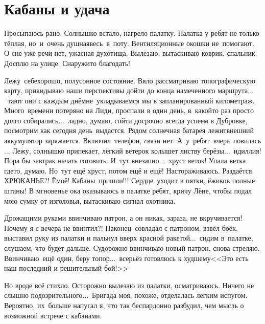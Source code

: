 \chapter{Кабаны и удача}
\vepsianrose

Просыпаюсь рано. Солнышко встало, нагрело палатку. Палатка у ребят не только тёплая, но~и~очень душная\mdash весь~в~поту. Вентиляционные окошки не~помогают. О сне уже речи нет, ужасная духотища. Вылезаю, вытаскиваю коврик, спальник. Досплю на улице. Снаружи\sdash то благодать! 

Лежу~себе\mdash хорошо, полусонное состояние. Вяло рассматриваю топографическую карту, прикидываю наши перспективы дойти до конца намеченного маршрута$\ldots$~тают они с каждым днём\mdash не~укладываемся мы в запланированный километраж. Много~времени потеряно на Лиди, проспали в один день, в~какой\sdash то раз просто долго собирались$\ldots$~ладно, думаю, сойти досрочно всегда успеем в Дубровке, посмотрим как сегодня день~выдастся. Рядом солнечная батарея лежит\mdash внешний аккумулятор заряжается. Включил~телефон, cвязи нет. А~у~ребят~вчера~ловилась$\ldots$ 
\newpage
Лежу, солнышко припекает, лёгкий ветерок колышет листву берёзы$\ldots$~идиллия! Пора бы завтрак начать готовить. И~тут внезапно$\ldots$~хруст веток! Упала ветка где\sdash то, думаю. Но~тут ещё хруст, потом ещё и ещё! Настораживаюсь. Раздаётся ХРЮКАНЬЕ?! Ё\sdash моё! Кабаны~пришли!!! Сердце~уходит в пятки, ёжиков полные штаны! В мгновенье ока оказываюсь в палатке ребят, кричу Лёне, чтобы подал мою сумку от изголовья, вытаскиваю сигнал охотника. 

Дрожащими руками ввинчиваю патрон, а он никак, зараза, не вкручивается! Почему я с вечера не ввинтил?! Наконец~совладал с патроном, взвёл боёк, выставил руку из палатки и пальнул вверх красной ракетой$\ldots$~сидим в~палатке, слушаем, что будет дальше. Судорожно ввинчиваю новый патрон, снова стреляю. Ввинчиваю~ещё один, беру топор$\ldots$~всерьёз готовлюсь к худшему\mdash <<Это есть наш последний и решительный бой!>> 

Но вроде всё стихло. Осторожно вылезаю из палатки, осматриваюсь. Ничего не слышно подозрительного$\ldots$~Бригада моя, похоже, отделалась лёгким испугом. Вероятно, их~больше напугал я, что так беспардонно разбудил, чем мысль о возможной встрече с кабанами.

